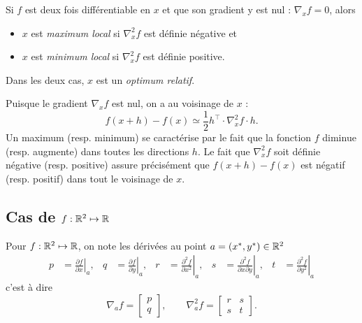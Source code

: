 \begin{definition*}
  Si $f$ est deux fois différentiable en $x$ et que son gradient y est nul : $\nabla_xf = 0$, alors
  \begin{itemize}
   \item $x$ est {\em maximum local} si $\nabla^2_x f$ est définie négative et
   \item $x$ est {\em minimum local} si $\nabla^2_x f$ est définie positive.
  \end{itemize}
  Dans les deux cas, $x$ est un {\em optimum relatif}.
\end{definition*}

\remark
Puisque le gradient $\nabla_x f$ est nul, on a au voisinage de $x$ :
$$
f(x+h) - f(x) \simeq \frac12 h^\top \cdot \nabla^2_x f \cdot h.
$$
Un maximum (resp. minimum) se caractérise par le fait que la fonction $f$ diminue (resp. augmente) dans toutes les directions $h$. Le fait que $\nabla^2_x f$ soit définie négative (resp. positive) assure précisément que $f(x+h) - f(x)$ est négatif (resp. positif) dans tout le voisinage de $x$.

\subsection*{Cas de $f : \mathbb{R}^2 \mapsto \mathbb{R}$}

\begin{definition*}
  Pour $f : \mathbb{R}^2 \mapsto \mathbb{R}$, on note les dérivées au point $a = (x^*, y^*) \in \mathbb{R}^2$
  \begin{align*}
    p & = \left.\frac{\partial f}{\partial x}\right|_a, &
    q & = \left.\frac{\partial f}{\partial y}\right|_a, &
    r & = \left.\frac{\partial^2 f}{\partial x^2}\right|_a, &
    s & = \left.\frac{\partial^2 f}{\partial x \partial y}\right|_a, &
    t & = \left.\frac{\partial^2 f}{\partial y^2}\right|_a
  \end{align*}
  c'est à dire
  $$
  \nabla_af = \left[\begin{array}{c} p \\ q \end{array} \right], 
  \qquad 
  \nabla^2_af = \left[\begin{array}{cc} r & s \\ s & t \end{array} \right].
  $$
\end{definition*}

